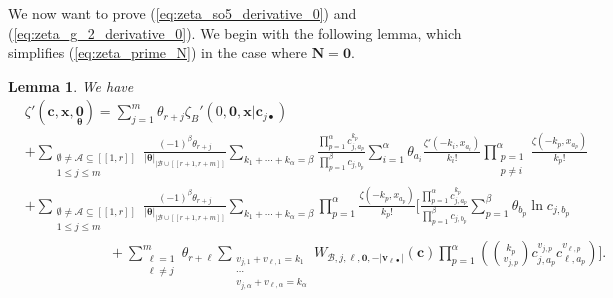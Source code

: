 \documentclass[a4paper]{amsart}
\newtheorem{lemma}[theorem]{Lemma}
\theoremstyle{remark}
\theoremstyle{definition}
\begin{document}
We now want to prove (\ref{eq:zeta_so5_derivative_0}) and (\ref{eq:zeta_g_2_derivative_0}). We begin with the following lemma, which simplifies (\ref{eq:zeta_prime_N}) in the case where $\mathbf{N}=\mathbf{0}$.
\begin{lemma}
\label{lem:value_zeta_s_0}
We have
\begin{align*}
    & \zeta'(\mathbf{c},\mathbf{x},\underset{\bm{\theta}}{\mathbf{0}}) = \sum_{j=1}^{m} \theta_{r+j} \zeta_B'(0,\mathbf{0},\mathbf{x}|\mathbf{c}_{j\bullet}) \nonumber \\
    & + \sum_{\substack{\emptyset \neq \mathcal{A} \subseteq [\![1,r]\!] \\ 1 \leq j \leq m}} \frac{(-1)^{\beta}\theta_{r+j}}{|\bm{\theta}|_{|\mathcal{B}\cup[\![r+1,r+m]\!]}}\sum_{k_1+\cdots+k_{\alpha}=\beta} \frac{\prod_{p=1}^\alpha c_{j,a_p}^{k_p}}{\prod_{p=1}^\beta c_{j,b_p}} \sum_{i=1}^{\alpha} \theta_{a_i} \frac{\zeta'(-k_i,x_{a_i})}{k_i!} \prod_{\substack{p=1 \\ p \neq i}}^{\alpha} \frac{\zeta(-k_p,x_{a_p})}{k_p!} \\
    & + \sum_{\substack{\emptyset \neq \mathcal{A} \subseteq [\![1,r]\!] \\ 1 \leq j \leq m}} \frac{(-1)^{\beta}\theta_{r+j}}{|\bm{\theta}|_{|\mathcal{B}\cup[\![r+1,r+m]\!]}}\sum_{k_1+\cdots+k_{\alpha}=\beta} \prod_{p=1}^{\alpha} \frac{\zeta(-k_p,x_{a_p})}{k_p!} \Bigg[ \frac{\prod_{p=1}^\alpha c_{j,a_p}^{k_p}}{\prod_{p=1}^\beta c_{j,b_p}} \sum_{p=1}^{\beta} \theta_{b_p} \ln c_{j,{b_p}} \nonumber \\
    & \qquad \qquad \qquad+ \sum_{\substack{\ell=1 \\ \ell \neq j}}^{m} \theta_{r+\ell} \sum_{\substack{v_{j,1}+v_{\ell,1}=k_1 \\ \cdots \\ v_{j,\alpha}+v_{\ell,\alpha} = k_{\alpha}}} W_{\mathcal{B},j,\ell,\mathbf{0},-|\mathbf{v}_{\ell \bullet}|}(\mathbf{c}) \prod_{p=1}^{\alpha} \left( \binom{k_p}{v_{j,p}} c_{j,a_p}^{v_{j,p}}c_{\ell,a_p}^{v_{\ell,p}} \right) \Bigg].
\end{align*}
\end{lemma}
\end{document}
